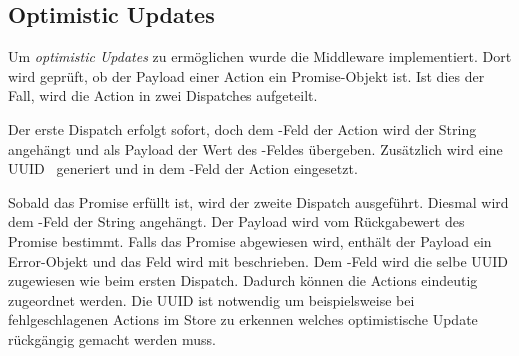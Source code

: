 \subsection{Optimistic Updates}
\label{ssec:fm_optimistic_updates}

Um \emph{optimistic Updates} zu ermöglichen wurde die Middleware
 implementiert.  Dort wird geprüft, ob der Payload einer Action
ein Promise-Objekt ist.  Ist dies der Fall, wird die Action in zwei Dispatches
aufgeteilt.

Der erste Dispatch erfolgt sofort, doch dem -Feld der
Action wird der String  angehängt und als Payload der
Wert des -Feldes übergeben.  Zusätzlich wird eine UUID~\cite{RFC4122}
generiert und in dem -Feld der Action eingesetzt.

Sobald das Promise erfüllt ist, wird der zweite Dispatch ausgeführt.  Diesmal
wird dem -Feld der String  angehängt.  Der Payload
wird vom Rückgabewert des Promise bestimmt.  Falls das Promise abgewiesen wird,
enthält der Payload ein Error-Objekt und das Feld  wird mit
 beschrieben.  Dem -Feld wird die selbe UUID zugewiesen
wie beim ersten Dispatch.  Dadurch können die Actions eindeutig zugeordnet
werden.  Die UUID ist notwendig um beispielsweise bei fehlgeschlagenen Actions
im Store zu erkennen welches optimistische Update rückgängig gemacht werden
muss.
